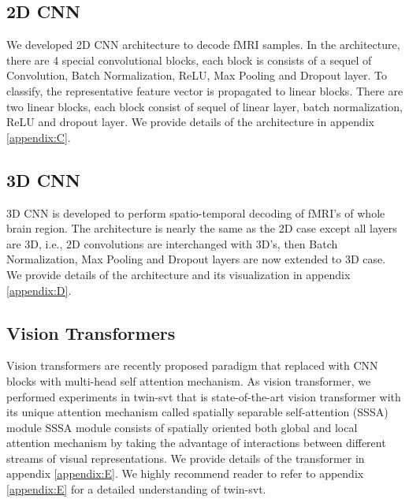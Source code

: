 \documentclass[10pt, twocolumn, letterpaper]{article}
\begin{document}
\subsection{2D CNN}
We developed 2D CNN architecture to decode fMRI samples. In the architecture, there are 4 special convolutional blocks, each block is consists of a sequel of Convolution, Batch Normalization, ReLU, Max Pooling and Dropout layer. To classify, the representative feature vector is propagated to linear blocks. There are two linear blocks, each block consist of sequel of linear layer, batch normalization, ReLU and dropout layer. We provide details of the architecture in appendix \ref{appendix:C}.

\subsection{3D CNN}
3D CNN is developed to perform spatio-temporal decoding of fMRI's of whole brain region. The architecture is nearly the same as the 2D case except all layers are 3D, i.e., 2D convolutions are interchanged with 3D's, then Batch Normalization, Max Pooling and Dropout layers are now extended to 3D case. We provide details of the architecture and its visualization in appendix \ref{appendix:D}.

\subsection{Vision Transformers}
Vision transformers are recently proposed paradigm that replaced with CNN blocks with multi-head self attention mechanism. As vision transformer, we performed experiments in twin-svt \cite{chu2021twins} that is state-of-the-art vision transformer with its unique attention mechanism called spatially separable self-attention (SSSA) module SSSA module consists of spatially oriented both global and local attention mechanism by taking the advantage of interactions between different streams of visual representations. We provide details of the transformer in appendix \ref{appendix:E}. We highly recommend reader to refer to appendix \ref{appendix:E} for a detailed understanding of twin-svt.    
\end{document}
